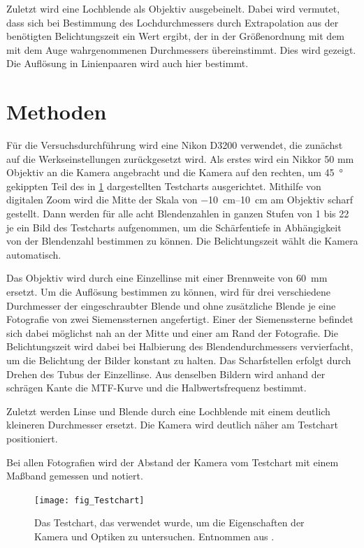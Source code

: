 \documentclass[
	a4paper,
	12pt,
	pagesize,
	ngerman
]{scrartcl}
\begin{document}
	Zuletzt wird eine Lochblende als Objektiv ausgebeinelt. %
	Dabei wird vermutet, dass sich bei Bestimmung des Lochdurchmessers durch Extrapolation aus der benötigten Belichtungszeit ein Wert ergibt, der in der Größenordnung mit dem mit dem Auge wahrgenommenen Durchmessers übereinstimmt.
	Dies wird gezeigt.
	Die Auflösung in Linienpaaren wird auch hier bestimmt.
	
	\section{Methoden}
	Für die Versuchsdurchführung wird eine Nikon D3200 verwendet, die zunächst auf die Werkseinstellungen zurückgesetzt wird. %
	Als erstes wird ein Nikkor 50 mm Objektiv an die Kamera angebracht und die Kamera auf den rechten, um \SI{45}{\degree} gekippten Teil des in \cref{fig_testchart} dargestellten Testcharts ausgerichtet.
	Mithilfe von digitalen Zoom wird die Mitte der Skala von \SIrange{-10}{10}{\centi \meter} am Objektiv scharf gestellt.
	Dann werden für alle acht Blendenzahlen in ganzen Stufen von 1 bis 22 je ein Bild des Testcharts aufgenommen, um die Schärfentiefe in Abhängigkeit von der Blendenzahl bestimmen zu können.
	Die Belichtungszeit wählt die Kamera automatisch.
	
	Das Objektiv wird durch eine Einzellinse mit einer Brennweite von \SI{60}{\milli \meter} ersetzt.
	Um die 	Auflösung bestimmen zu können, wird für drei verschiedene Durchmesser der eingeschraubter Blende und ohne zusätzliche Blende je eine Fotografie von zwei Siemenssternen angefertigt.
	Einer der Siemenssterne befindet sich dabei möglichst nah an der Mitte und einer am Rand der Fotografie.
	Die Belichtungszeit wird dabei bei Halbierung des Blendendurchmessers vervierfacht, um die Belichtung der Bilder konstant zu halten. %
	Das Scharfstellen erfolgt durch Drehen des Tubus der Einzellinse.
	Aus denselben Bildern wird anhand der schrägen Kante die MTF-Kurve und die Halbwertsfrequenz bestimmt.
	
	Zuletzt werden Linse und Blende durch eine Lochblende mit einem deutlich kleineren Durchmesser ersetzt. %
	Die Kamera wird deutlich näher am Testchart positioniert.
	
	Bei allen Fotografien wird der Abstand der Kamera vom Testchart mit einem Maßband gemessen und notiert.
	\begin{figure}[H] 
		\texttt{[image: fig\_Testchart]}
		\centering
		\caption{Das Testchart, das verwendet wurde, um die Eigenschaften der Kamera und Optiken zu untersuchen. Entnommen aus \cite{Testchart}.} %
		\label{fig_testchart}
		\centering
	\end{figure}
	
\end{document}
